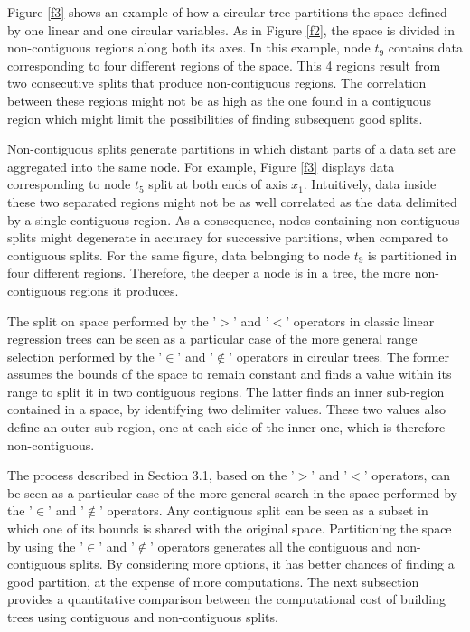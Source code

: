 \documentclass[times,twocolumn,final,authoryear]{elsarticle}
\begin{document}
Figure \ref{f3} shows an example of how a circular tree partitions the space defined by one linear and one circular variables. As in Figure \ref{f2}, the space is divided in non-contiguous regions along both its axes. In this example, node $t_9$ contains data corresponding to four different regions of the space. This 4 regions result from two consecutive splits that produce non-contiguous regions. The correlation between these regions might not be as high as the one found in a contiguous region which might limit the possibilities of finding subsequent good splits. 

Non-contiguous splits generate partitions in which distant parts of a data set are aggregated into the same node. For example, Figure \ref{f3} displays data corresponding to node $t_5$ split at both ends of axis $x_1$. Intuitively, data inside these two separated regions might not be as well correlated as the data delimited by a single contiguous region. As a consequence, nodes containing non-contiguous splits might degenerate in accuracy for successive partitions, when compared to contiguous splits. For the same figure, data belonging to node $t_9$ is partitioned in four different regions. Therefore, the deeper a node is in a tree, the more non-contiguous regions it produces.

The split on space performed by the '$>$' and '$<$' operators in classic linear regression trees can be seen as a particular case of the more general range selection performed by the '$\in$' and '$\notin$' operators in circular trees. The former assumes the bounds of the space to remain constant and finds a value within its range to split it in two contiguous regions. The latter finds an inner sub-region contained in a space, by identifying two delimiter values. These two values also define an outer sub-region, one at each side of the inner one, which is therefore non-contiguous.

The process described in Section 3.1, based on the '$>$' and '$<$' operators, can be seen as a particular case of the more general search in the space performed by the '$\in$' and '$\notin$' operators. Any contiguous split can be seen as a subset in which one of its bounds is shared with the original space. Partitioning the space by using the '$\in$' and '$\notin$' operators generates all the contiguous and non-contiguous splits. By considering more options, it has better chances of finding a good partition, at the expense of more computations. The next subsection provides a quantitative comparison between the computational cost of building trees using contiguous and non-contiguous splits.
\end{document}

